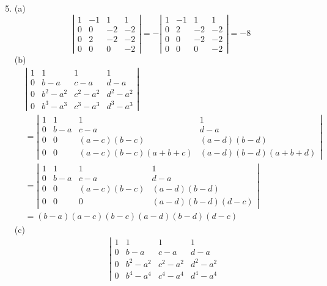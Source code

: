 \documentclass[a4paper, 12pt]{article}
\begin{document}
\begin{enumerate}
		\setcounter{enumi}{4}
		\item (a)
		\[ \left| \begin{array}{cccc}
		1 & -1 & 1 & 1 \\
		0 & 0 & -2 & -2 \\
		0 & 2 & -2 & -2 \\
		0 & 0 & 0 & -2
		\end{array} \right|
		= -\left| \begin{array}{cccc}
		1 & -1 & 1 & 1 \\
		0 & 2 & -2 & -2 \\
		0 & 0 & -2 & -2 \\
		0 & 0 & 0 & -2
		\end{array} \right|
		= -8 \]
		(b)
		\begin{align*}
		&\left| \begin{array}{cccc}
		1 & 1 & 1 & 1 \\
		0 & b - a & c - a & d - a \\
		0 & b^2 - a^2 & c^2 - a^2 & d^2 - a^2 \\
		0 & b^3 - a^3 & c^3 - a^3 & d^3 - a^3
		\end{array} \right| \\
		&= \left| \begin{array}{cccc}
		1 & 1 & 1 & 1 \\
		0 & b - a & c - a & d - a \\
		0 & 0 & (a - c)(b - c) & (a - d)(b - d) \\
		0 & 0 & (a - c)(b - c)(a + b + c) & (a - d)(b - d)(a + b + d)
		\end{array} \right| \\
		&= \left| \begin{array}{cccc}
		1 & 1 & 1 & 1 \\
		0 & b - a & c - a & d - a \\
		0 & 0 & (a - c)(b - c) & (a - d)(b - d) \\
		0 & 0 & 0 & (a - d)(b - d)(d - c)
		\end{array} \right| \\
		&= (b - a)(a - c)(b - c)(a - d)(b - d)(d - c)
		\end{align*}
		(c)
		\begin{align*}
		&\left| \begin{array}{cccc}
		1 & 1 & 1 & 1 \\
		0 & b - a & c - a & d - a \\
		0 & b^2 - a^2 & c^2 - a^2 & d^2 - a^2 \\
		0 & b^4 - a^4 & c^4 - a^4 & d^4 - a^4

\end{array}
\end{align*}
\end{enumerate}
\end{document}
